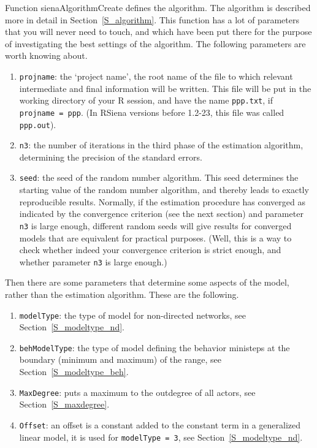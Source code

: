 \documentclass[a4paper,fleqn,11pt]{article}
\newcommand{\+}{\, + \,}
\newcommand{\sfn}[1]{\textsf{#1}}
\newcommand{\RS}{{\sf RSiena }}
\begin{document}
Function \sfn{sienaAlgorithmCreate} defines the algorithm.
The algorithm is described more in detail in Section~\ref{S_algorithm}.
This function has a lot of parameters that you will never need to touch,
and which have been put there for the purpose of investigating
the best settings of the algorithm.
The following parameters are worth knowing about.
\begin{enumerate}
  \item \texttt{projname}: the `project name', the root name of the file
       to which relevant intermediate and final information will be written.
       This file will be put in the working directory of your R session,
       and have the name \texttt{ppp.txt}, if \texttt{projname~=~ppp}.
       (In \RS versions before 1.2-23, this file was called \texttt{ppp.out}).
  \item \texttt{n3}: the number of iterations in the third phase of the estimation
       algorithm, determining the precision of the standard errors.
  \item \texttt{seed}: the seed of the random number algorithm. This seed determines
       the starting value of the random number algorithm, and thereby leads
       to exactly reproducible results. Normally, if the estimation procedure
       has converged as indicated by the convergence criterion (see the next section) and
       parameter \texttt{n3} is large enough, different random seeds will give
       results for converged models that are equivalent for practical purposes.
       (Well, this is a way to check
       whether indeed your convergence criterion is strict enough, and whether
       parameter \texttt{n3} is large enough.)
\end{enumerate}
Then there are some parameters that determine some aspects of the
model, rather than the estimation algorithm. These are the following.
\begin{enumerate}[resume]
  \item \texttt{modelType}: the type of model for non-directed networks,
        see Section~\ref{S_modeltype_nd}.
  \item \texttt{behModelType}: the type of model defining the behavior
        ministeps at the boundary (minimum and maximum) of the range,
        see Section~\ref{S_modeltype_beh}.
  \item \texttt{MaxDegree}: puts a maximum to the outdegree of all actors,
        see Section~\ref{S_maxdegree}.
  \item \texttt{Offset}: an offset is a constant added to the
        constant term in a generalized linear model, it is used for
         \texttt{modelType~=~3}, see Section~\ref{S_modeltype_nd}.
\end{enumerate}
\end{document}
